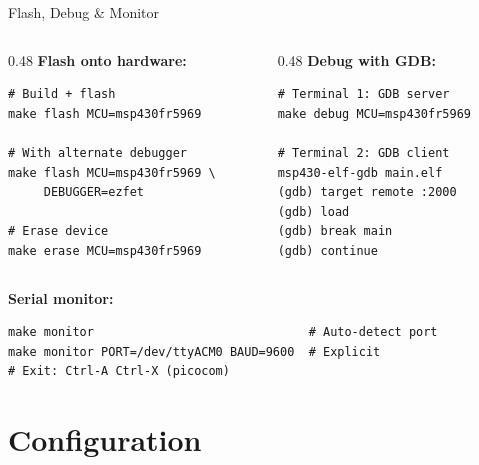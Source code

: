 \documentclass[aspectratio=169, 10pt]{beamer}
\begin{document}
\begin{frame}[fragile]{Flash, Debug \& Monitor}
\begin{columns}[T]
\begin{column}{0.48\textwidth}
\textbf{Flash onto hardware:}
\begin{lstlisting}[style=bashstyle]
# Build + flash
make flash MCU=msp430fr5969

# With alternate debugger
make flash MCU=msp430fr5969 \
     DEBUGGER=ezfet

# Erase device
make erase MCU=msp430fr5969
\end{lstlisting}
\end{column}
\begin{column}{0.48\textwidth}
\textbf{Debug with GDB:}
\begin{lstlisting}[style=bashstyle]
# Terminal 1: GDB server
make debug MCU=msp430fr5969

# Terminal 2: GDB client
msp430-elf-gdb main.elf
(gdb) target remote :2000
(gdb) load
(gdb) break main
(gdb) continue
\end{lstlisting}
\end{column}
\end{columns}

\vspace{0.5em}
\textbf{Serial monitor:}
\begin{lstlisting}[style=bashstyle]
make monitor                              # Auto-detect port
make monitor PORT=/dev/ttyACM0 BAUD=9600  # Explicit
# Exit: Ctrl-A Ctrl-X (picocom)
\end{lstlisting}
\end{frame}

\section{Configuration}
\end{document}
